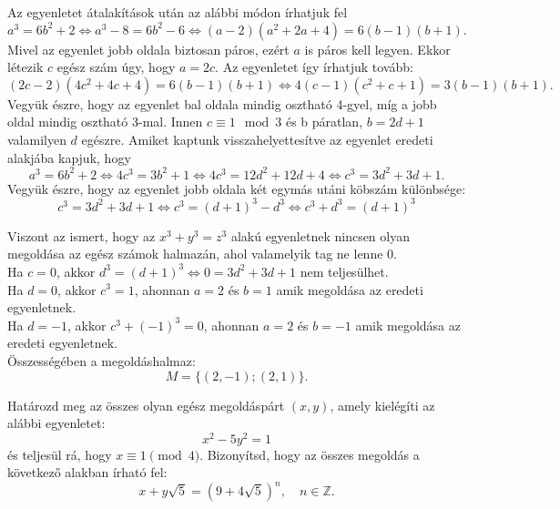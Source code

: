 \begin{solution}
	Az egyenletet átalakítások után az alábbi módon írhatjuk fel 
	\[
	a^{3}=6b^{2}+2\iff a^{3}-8=6b^{2}-6\iff(a-2)(a^{2}+2a+4)=6(b-1)(b+1).
	\]
	Mivel az egyenlet jobb oldala biztosan páros, ezért $a$ is páros
	kell legyen. Ekkor létezik $c$ egész szám úgy, hogy $a=2c$. Az egyenletet
	így írhatjuk tovább: 
	\[
	(2c-2)(4c^{2}+4c+4)=6(b-1)(b+1)\iff4(c-1)(c^{2}+c+1)=3(b-1)(b+1).
	\]
	Vegyük észre, hogy az egyenlet bal oldala mindig osztható 4-gyel,
	míg a jobb oldal mindig osztható 3-mal. Innen $c\equiv1\mod 3$ és
	b páratlan, $b=2d+1$ valamilyen $d$ egészre. Amiket kaptunk visszahelyettesítve
	az egyenlet eredeti alakjába kapjuk, hogy 
	\[
	a^{3}=6b^{2}+2\iff4c^{3}=3b^{2}+1\iff4c^{3}=12d^{2}+12d+4\iff c^{3}=3d^{2}+3d+1.
	\]
	Vegyük észre, hogy az egyenlet jobb oldala két egymás utáni köbszám
	különbsége: 
	\[
	c^{3}=3d^{2}+3d+1\iff c^{3}=(d+1)^{3}-d^{3}\iff c^{3}+d^{3}=(d+1)^{3}
	\]
	
	Viszont az ismert, hogy az $x^{3}+y^{3}=z^{3}$ alakú egyenletnek
	nincsen olyan megoldása az egész számok halmazán, ahol valamelyik
	tag ne lenne 0.\\
	
	Ha $c=0$, akkor $d^{3}=(d+1)^{3}\iff0=3d^{2}+3d+1$ nem teljesülhet.\\
	
	Ha $d=0$, akkor $c^{3}=1$, ahonnan $a=2$ és $b=1$ amik megoldása
	az eredeti egyenletnek.\\
	
	Ha $d=-1$, akkor $c^{3}+(-1)^{3}=0$, ahonnan $a=2$ és $b=-1$ amik
	megoldása az eredeti egyenletnek.\\
	
	Összességében a megoldáshalmaz: 
	\[
	M=\{(2,-1);(2,1)\}.
	\]
\end{solution}
\begin{extraproblem}
	Határozd meg az összes olyan egész megoldáspárt $(x,y)$, amely kielégíti
	az alábbi egyenletet:
	\[
	x^{2}-5y^{2}=1
	\]
	és teljesül rá, hogy $x\equiv1\pmod 4$. Bizonyítsd, hogy az összes
	megoldás a következő alakban írható fel:
	\[
	x+y\sqrt{5}=(9+4\sqrt{5})^{n},\quad n\in\mathbb{Z}.
	\]
\end{extraproblem}

